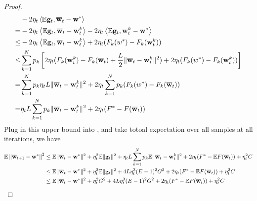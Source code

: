 \begin{proof}
\begin{align*}
	& -2 \eta_{t} \left<\mathbb{E} {\mathbf{g}}_{t}, {\overline{\mathbf{w}}}_{t}-{\mathbf{w}}^{*}\right> \\
 =  & -2 \eta_{t} \left<\mathbb{E} {\mathbf{g}}_{t}, {\overline{\mathbf{w}}}_{t}- {\mathbf{w}}^{k}_t \right> -2 \eta_{t} \left<\mathbb{E} {\mathbf{g}}_{t}, {\mathbf{w}}^{k}_t - {\mathbf{w}}^{*}\right>\\
 \leq & -2 \eta_{t} \left<\mathbb{E} {\mathbf{g}}_{t}, {\overline{\mathbf{w}}}_{t}- {\mathbf{w}}^{k}_t \right> + 2 \eta_{t} (F_k(w^*) - F_k({\mathbf{w}}^{k}_t))\\
 \leq &\sum_{k=1}^N p_k \left[2 \eta_{t} (F_k({\mathbf{w}}^{k}_t) - F_k({\overline{\mathbf{w}}}_t) + \frac{L}{2} \|{\overline{\mathbf{w}}}_t - {\mathbf{w}}^{k}_t\|^2 ) + 2 \eta_{t} (F_k(w^*) - F_k({\mathbf{w}}^{k}_t))\right]\\
 = & \sum_{k=1}^N p_k \eta_t L \|{\overline{\mathbf{w}}}_t - {\mathbf{w}}^{k}_t\|^2 + 2 \eta_{t} \sum_{k=1}^N p_k (F_k(w^*) - F_k({\overline{\mathbf{w}}}_t))\\
 = &  \eta_t L \sum_{k=1}^N p_k \|{\overline{\mathbf{w}}}_t - {\mathbf{w}}^{k}_t\|^2 + 2 \eta_{t} (F^* - F({\overline{\mathbf{w}}}_t))
\end{align*}
Plug in this upper bound into \eq{\ref{eq:expandsgd}}, \eq{\ref{eq:sgdcvxsmth1}} and take totoal expectation over all samples at all iterations, we have
\begin{align}
\mathbb{E}\left\|{\overline{\mathbf{w}}}_{t+1}-{\mathbf{w}}^{*}\right\|^2 &\leq \mathbb{E}\|{\overline{\mathbf{w}}}_{t}-{\mathbf{w}}^{*}\|^{2}+\eta_{t}^{2} \mathbb{E}\| {\mathbf{g}}_{t} \|^{2} + \eta_t L \sum_{k=1}^N p_k \mathbb{E} \|{\overline{\mathbf{w}}}_t - {\mathbf{w}}^{k}_t\|^2 + 2 \eta_{t} (F^* - \mathbb{E} F({\overline{\mathbf{w}}}_t)) + \eta_t^2 C\\
&\leq\mathbb{E} \|{\overline{\mathbf{w}}}_{t}-{\mathbf{w}}^{*}\|^{2}+\eta_{t}^{2} \mathbb{E}\| {\mathbf{g}}_{t} \|^{2} +  4L\eta_t^3(E-1)^2 G^2 + 2 \eta_{t} (F^* - \mathbb{E} F({\overline{\mathbf{w}}}_t)) + \eta_t^2 C\\
&\leq \mathbb{E}\|{\overline{\mathbf{w}}}_{t}-{\mathbf{w}}^{*}\|^{2}+\eta_{t}^{2} G^2 +  4L\eta_t^3(E-1)^2 G^2 + 2 \eta_{t} (F^* - \mathbb{E} F({\overline{\mathbf{w}}}_t))+\eta_t^2 C \label{eq:cvxsgd1}
\end{align}


\end{proof}
